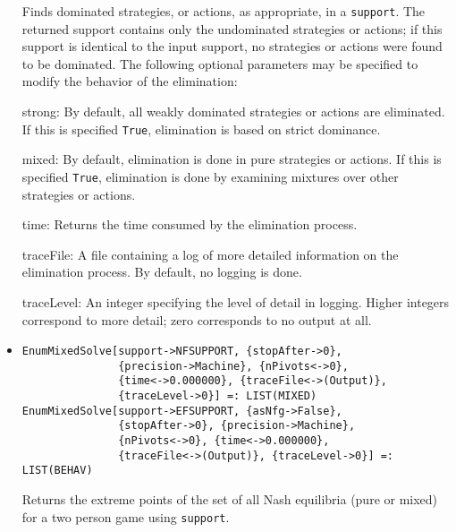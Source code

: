 \begin{itemize}
\bd
Finds dominated strategies, or actions, as appropriate, in a 
\verb+support+.  The returned support contains only the undominated
strategies or actions; if this support is identical to the input support,
no strategies or actions were found to be dominated.  The following
optional parameters may be specified to modify the behavior of
the elimination:

\bd
\item [strong:] By default, all weakly dominated strategies or actions
are eliminated.  If this is specified \verb+True+, elimination is based
on strict dominance.
\item [mixed:] By default, elimination is done in pure strategies or
actions.  If this is specified \verb+True+, elimination is done by
examining mixtures over other strategies or actions.
\item [time:] Returns the time consumed by the elimination process.
\item [traceFile:] A file containing a log of more detailed information
on the elimination process.  By default, no logging is done.
\item [traceLevel:] An integer specifying the level of detail in logging.
Higher integers correspond to more detail; zero corresponds to no output
at all.
\ed
\ed

\item{}
\protect \large \begin{verbatim}
EnumMixedSolve[support->NFSUPPORT, {stopAfter->0}, 
               {precision->Machine}, {nPivots<->0}, 
               {time<->0.000000}, {traceFile<->(Output)}, 
               {traceLevel->0}] =: LIST(MIXED) 
EnumMixedSolve[support->EFSUPPORT, {asNfg->False}, 
               {stopAfter->0}, {precision->Machine}, 
               {nPivots<->0}, {time<->0.000000}, 
               {traceFile<->(Output)}, {traceLevel->0}] =: LIST(BEHAV) 
\end{verbatim}\normalsize
{}
\bd
Returns the extreme points of the set of all Nash equilibria (pure or
mixed) for a two person game using \verb+support+.


\end{itemize}
